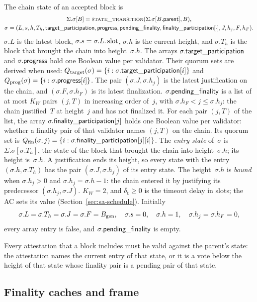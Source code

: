 The chain state of an accepted block is
\[
 \begin{gathered}
 \Sigma.\sigma[B]=\Call{state\_transition}{\Sigma.\sigma[B.\parent],B},\\
 \sigma=(L,s,h,T_h,\targetParticipation,\progressBit,\pendingFinality,\finalityParticipation[\cdot],J,h_j,F,h_F).
 \end{gathered}
\]
$\sigma.L$ is the latest block, $\sigma.s=\sigma.L.\operatorname{slot}$, $\sigma.h$ is
the current height, and $\sigma.T_h$ is the block that brought the chain
into height~$\sigma.h$.  The arrays $\sigma.\mathsf{target\_participation}$ and
$\sigma.\mathsf{progress}$ hold one Boolean value per validator.  Their quorum
sets are derived when used:
$Q_{\mathrm{target}}(\sigma)=\{i:\sigma.\mathsf{target\_participation}[i]\}$ and
$Q_{\mathrm{prog}}(\sigma)=\{i:\sigma.\mathsf{progress}[i]\}$.  The pair
$(\sigma.J,\sigma.h_j)$ is the latest justification on the chain, and
$(\sigma.F,\sigma.h_F)$ is its latest finalization.  $\sigma.\mathsf{pending\_finality}$ is a list of at most $K_W$ pairs $(j,T)$ in
increasing order of~$j$, with $\sigma.h_F<j\leq\sigma.h_j$: the chain
justified~$T$ at height~$j$ and has not finalized it.  For each pair
$(j,T)$ of the list, the array $\sigma.\mathsf{finality\_participation}[j]$ holds
one Boolean value per validator: whether a finality pair of that
validator names $(j,T)$ on the chain.  Its quorum set is
$Q_{\mathrm{fin}}(\sigma,j)=\{i:\sigma.\mathsf{finality\_participation}[j][i]\}$.  The
\emph{entry state} of~$\sigma$ is $\Sigma.\sigma[\sigma.T_h]$, the state
of the block that brought the chain into height~$\sigma.h$; its height
is~$\sigma.h$.  A justification ends its height, so every state with the
entry $(\sigma.h,\sigma.T_h)$ has the pair $(\sigma.J,\sigma.h_j)$ of its
entry state.  The height~$\sigma.h$ is \emph{bound} when $\sigma.h_j>0$
and $\sigma.h_j=\sigma.h-1$: the chain entered it by justifying its
predecessor $(\sigma.h_j,\sigma.J)$.  $K_W=2$, and
$\delta_{\mathrm{t}}\geq0$ is the timeout delay in slots; the AC sets its
value (Section~\ref{sec:sa-schedule}).  Initially
\[
 \sigma.L=\sigma.T_h=\sigma.J=\sigma.F=B_{\mathrm{gen}},\quad
 \sigma.s=0,\quad \sigma.h=1,\quad \sigma.h_j=\sigma.h_F=0,
\]
every array entry is false, and $\sigma.\mathsf{pending\_finality}$ is empty.

Every attestation that a block includes must be valid against the
parent's state: the attestation names the current entry of that state, or
it is a vote below the height of that state whose finality pair is a
pending pair of that state.

\subsection{Finality caches and frame}\label{sec:fg-frame}

